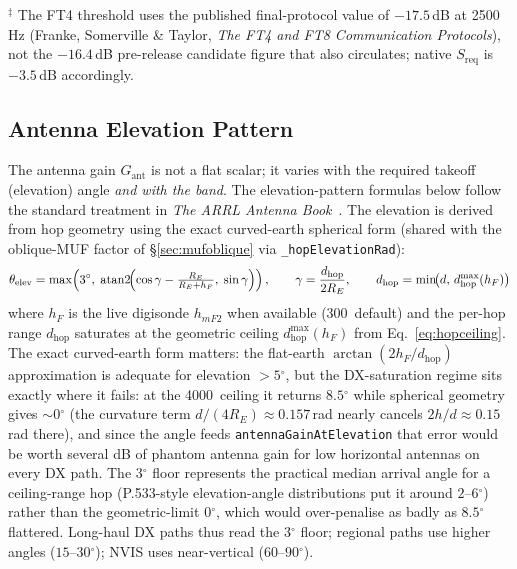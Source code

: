 \documentclass[11pt,a4paper]{article}
\newcommand{\SI}[2]{#1\,\text{#2}}
\newcommand{\km}{\text{km}}
\newcommand{\degree}{\ensuremath{{}^\circ}}
\begin{document}
\begin{table}[H]
$^{\ddagger}$ The FT4 threshold uses the published
final-protocol value of $-17.5$\,dB at 2500\,Hz
(Franke, Somerville \& Taylor, \emph{The FT4 and FT8
Communication Protocols}), not the $-16.4$\,dB pre-release
candidate figure that also circulates; native $S_{\text{req}}$
is $-3.5$\,dB accordingly.
\end{table}

\subsection{Antenna Elevation Pattern}\label{sec:antpattern}

The antenna gain $G_{\text{ant}}$ is not a flat scalar; it varies with
the required takeoff (elevation) angle \emph{and with the band}.  The
elevation-pattern formulas below follow the standard treatment in
\emph{The ARRL Antenna Book}~\cite{arrl2023antenna}.  The elevation is
derived from hop geometry using the exact curved-earth spherical
form (shared with the oblique-MUF factor of
\S\ref{sec:mufoblique} via \texttt{\_hopElevationRad}):
\begin{equation}\label{eq:takeoff}
  \theta_{\text{elev}} = \max\!\left(3\degree,\;
    \operatorname{atan2}\!\Bigl(\cos\gamma - \tfrac{R_E}{R_E + h_F},\;
    \sin\gamma\Bigr)\right),
  \qquad
  \gamma = \frac{d_{\text{hop}}}{2 R_E},
  \qquad
  d_{\text{hop}} = \min\!\bigl(d,\, d_{\text{hop}}^{\max}(h_F)\bigr)
\end{equation}
where $h_F$ is the live digisonde $h_{m\!F2}$ when available
(\SI{300}{\km} default) and the per-hop range
$d_{\text{hop}}$ saturates at the geometric ceiling
$d_{\text{hop}}^{\max}(h_F)$ from Eq.~\ref{eq:hopceiling}.  The
exact curved-earth form matters: the flat-earth
$\arctan(2 h_F / d_{\text{hop}})$ approximation is
adequate for elevation $> 5\degree$, but the DX-saturation
regime sits exactly where it fails: at the \SI{4000}{\km}
ceiling it returns $8.5\degree$ while spherical geometry gives
${\sim}0\degree$ (the curvature term $d/(4R_E) \approx
0.157$\,rad nearly cancels $2h/d \approx 0.15$\,rad there), and
since the angle feeds \texttt{antennaGainAtElevation} that error
would be worth several dB of phantom antenna gain for low horizontal
antennas on every DX path.  The $3\degree$ floor represents the
practical median arrival angle for a ceiling-range hop
(P.533-style elevation-angle distributions put it around
$2$--$6\degree$) rather than the geometric-limit $0\degree$,
which would over-penalise as badly as $8.5\degree$ flattered.
Long-haul
DX paths thus read the $3\degree$ floor; regional
paths use higher angles ($15$--$30\degree$); NVIS uses near-vertical
($60$--$90\degree$).
\end{document}

